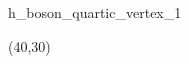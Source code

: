 \documentclass[class=minimal,border={5pt 15pt 10pt 15pt}]{standalone}
\begin{document}
	\unitlength=0.65mm
	\begin{fmffile}{h_boson_quartic_vertex_1}
		\begin{fmfgraph*}(40,30)
						
			

			
			
			
		\end{fmfgraph*}
	\end{fmffile}
\end{document}
